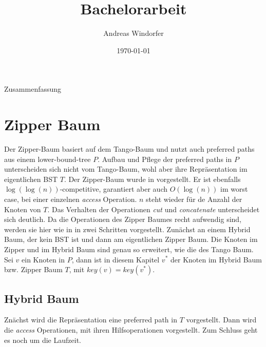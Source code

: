 \documentclass[a4paper,12pt]{article}
\title{Bachelorarbeit}
\author{
Andreas Windorfer\\
}
\date{\today}
\begin{document}
\maketitle
\newpage
Zusammenfassung
\newpage
\tableofcontents


\newpage


\section {Zipper Baum}
Der Zipper-Baum basiert auf dem Tango-Baum und nutzt auch preferred paths aus einem lower-bound-tree $P$. Aufbau und Pflege der preferred paths in $P$ unterscheiden sich nicht vom Tango-Baum, wohl aber ihre Repräsentation im eigentlichen BST $T$. Der Zipper-Baum wurde in \cite{zipper} vorgestellt. Er ist ebenfalls $\log\left(\log\left(n\right)\right)$-competitive,  garantiert aber auch  $O\left(\log \left(n\right)\right)$ im worst case, bei einer einzelnen \textit{access} Operation. $n$ steht wieder für de Anzahl der Knoten von $T$. Das Verhalten der Operationen \textit{cut} und \textit{concatenate} unterscheidet sich deutlich. Da die Operationen des Zipper Baumes recht aufwendig sind, werden sie hier wie in \cite{zipper} in zwei Schritten vorgestellt. Zunächst an einem Hybrid Baum, der kein  BST ist und dann am eigentlichen Zipper Baum. Die Knoten im Zipper und im Hybrid Baum sind genau so erweitert, wie die des Tango Baum.  Sei $v$ ein Knoten in $P$, dann ist in diesem Kapitel $v^*$ der Knoten im Hybrid Baum bzw. Zipper Baum $T$, mit $\mathit{key}\left(v\right) = \mathit{key}\left(v^*\right)$.

\subsection{Hybrid Baum}
Znächst wird die Repräsentation eine preferred path in $T$ vorgestellt. Dann wird die \textit{access} Operationen, mit ihren Hilfsoperationen vorgestellt. Zum Schluss geht es noch um die Laufzeit. 
\end{document}

